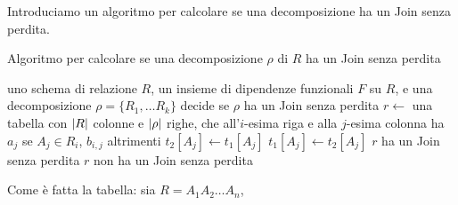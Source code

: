 Introduciamo un algoritmo per calcolare se una decomposizione ha un Join senza perdita.
\begin{algorithm}[ht]
\caption{Algoritmo per calcolare se una decomposizione $\rho$ di $R$ ha un Join senza perdita}
\begin{algorithmic}
\Require uno schema di relazione $R$, un insieme di dipendenze funzionali $F$ su $R$, e una decomposizione $\rho = \{R_1, \dots R_k\}$
\Ensure decide se $\rho$ ha un Join senza perdita
\State $r \gets$ una tabella con $\left\lvert{R}\right\rvert$ colonne e $\left\lvert{\rho}\right\rvert$ righe, che all'$i$-esima riga e alla $j$-esima colonna ha $a_j$ se $A_j \in R_i$, $b_{i,j}$ altrimenti
\Repeat
                    \State $t_2[A_j] \gets t_1[A_j]$
                \Else
                    \State $t_1[A_j] \gets t_2[A_j]$
                \EndIf
            \EndFor
        \EndFor
    \EndFor
{}
    \State \Return $r$ ha un Join senza perdita
\Else
    \State \Return $r$ non ha un Join senza perdita
\EndIf
\end{algorithmic}
\end{algorithm}


Come \`e fatta la tabella: sia $R = A_1 A_2 \dots A_n$,

